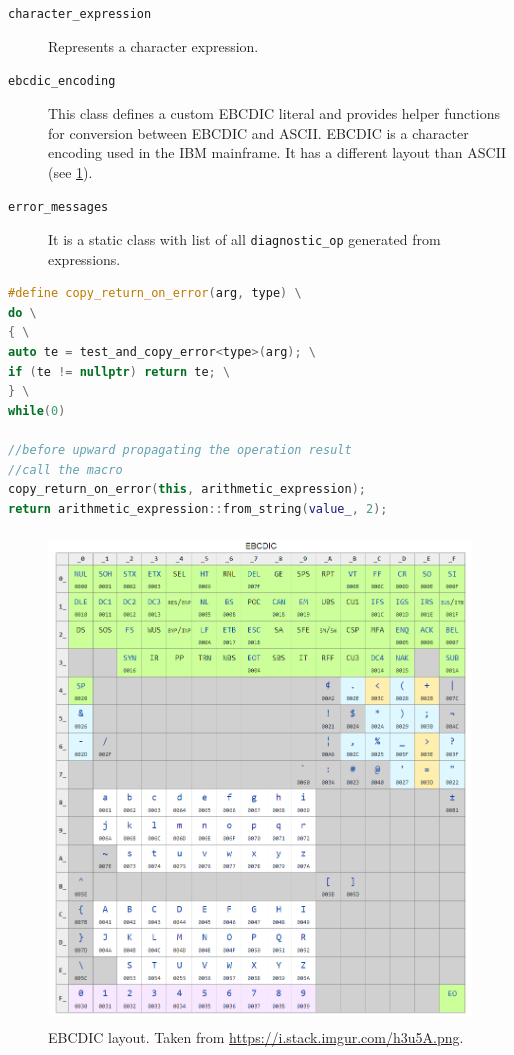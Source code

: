 \begin{description}
	\item[\texttt{character\_expression}] Represents a character expression.
	
	\item[\texttt{ebcdic\_encoding}] This class defines a custom EBCDIC literal and provides helper functions for conversion between EBCDIC and ASCII. EBCDIC is a character encoding used in the IBM mainframe. It has a different layout than ASCII (see \cref{ca_expr:ebcdic}).
	
	\item[\texttt{error\_messages}] It is a static class with list of all \texttt{diagnostic\_op} generated from expressions.
	
	
\end{description}
\begin{lstlisting}[label={ca_expr:example},language=C++,backgroundcolor=\color{cyan!10}, captionpos=b, caption=Defition of \texttt{copy\_return\_on\_error} macro and an example of its usage while evaluating unary expression \texttt{B2A("123")}. \texttt{this} is an \texttt{character\_expression} with value \texttt{"123"}.]
#define copy_return_on_error(arg, type) \
do \
{ \
auto te = test_and_copy_error<type>(arg); \
if (te != nullptr) return te; \
} \
while(0)

//before upward propagating the operation result
//call the macro
copy_return_on_error(this, arithmetic_expression);
return arithmetic_expression::from_string(value_, 2);

\end{lstlisting}

\begin{figure}
	\centering
	\includegraphics[height=13cm]{img/ebcdic}
	\caption{EBCDIC layout. Taken from \url{https://i.stack.imgur.com/h3u5A.png}.}
	\label{ca_expr:ebcdic}
\end{figure}

